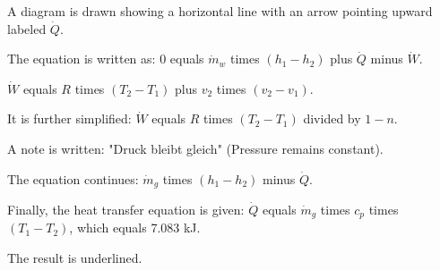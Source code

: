 A diagram is drawn showing a horizontal line with an arrow pointing upward labeled \( \dot{Q} \).  

The equation is written as:  
0 equals \( \dot{m}_w \) times \( (h_1 - h_2) \) plus \( \dot{Q} \) minus \( \dot{W} \).  

\( \dot{W} \) equals \( R \) times \( (T_2 - T_1) \) plus \( v_2 \) times \( (v_2 - v_1) \).  

It is further simplified:  
\( \dot{W} \) equals \( R \) times \( (T_2 - T_1) \) divided by \( 1 - n \).  

A note is written: "Druck bleibt gleich" (Pressure remains constant).  

The equation continues:  
\( \dot{m}_g \) times \( (h_1 - h_2) \) minus \( \dot{Q} \).  

Finally, the heat transfer equation is given:  
\( \dot{Q} \) equals \( \dot{m}_g \) times \( c_p \) times \( (T_1 - T_2) \), which equals 7.083 kJ.  

The result is underlined.